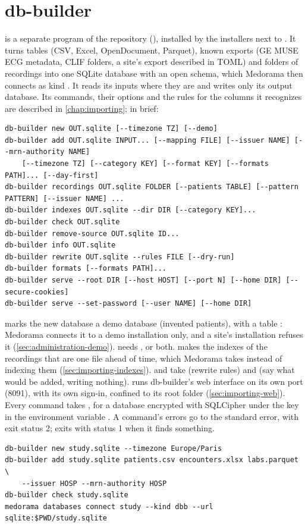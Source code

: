 \section{db-builder}
\label{sec:cli-db-builder}

 is a separate program of the repository (), installed by the
installers next to . It turns tables (CSV, Excel, OpenDocument, Parquet), known
exports (GE MUSE ECG metadata, CLIF folders, a site's export described in TOML) and folders of
recordings into one SQLite database with an open schema, which Medorama then connects as kind
. It reads its inputs where they are and writes only its output database. Its commands,
their options and the rules for the columns it recognizes are described in \cref{chap:importing};
in brief:

\begin{lstlisting}[style=signature]
db-builder new OUT.sqlite [--timezone TZ] [--demo]
db-builder add OUT.sqlite INPUT... [--mapping FILE] [--issuer NAME] [--mrn-authority NAME]
    [--timezone TZ] [--category KEY] [--format KEY] [--formats PATH]... [--day-first]
db-builder recordings OUT.sqlite FOLDER [--patients TABLE] [--pattern PATTERN] [--issuer NAME] ...
db-builder indexes OUT.sqlite --dir DIR [--category KEY]...
db-builder check OUT.sqlite
db-builder remove-source OUT.sqlite ID...
db-builder info OUT.sqlite
db-builder rewrite OUT.sqlite --rules FILE [--dry-run]
db-builder formats [--formats PATH]...
db-builder serve --root DIR [--host HOST] [--port N] [--home DIR] [--secure-cookies]
db-builder serve --set-password [--user NAME] [--home DIR]
\end{lstlisting}
 marks the new database a demo database (invented patients), with a table
: Medorama connects it to a demo installation only, and a site's installation
refuses it (\cref{sec:administration-demo}).  needs ,  or both.  makes the
indexes of the recordings that are one file ahead of time, which Medorama takes instead of
indexing them (\cref{sec:importing-indexes}).  and
 take  (rewrite rules) and  (say what would be
added, writing nothing).  runs db-builder's web interface on its own port (8091), with
its own sign-in, confined to its root folder (\cref{sec:importing-web}). Every command takes
, for a database encrypted with SQLCipher under the key in
the environment variable . A command's errors go to the standard error,
with exit status 2;  exits with status 1 when it finds something.
\begin{lstlisting}[style=shell]
db-builder new study.sqlite --timezone Europe/Paris
db-builder add study.sqlite patients.csv encounters.xlsx labs.parquet \
    --issuer HOSP --mrn-authority HOSP
db-builder check study.sqlite
medorama databases connect study --kind dbb --url sqlite:$PWD/study.sqlite
\end{lstlisting}


